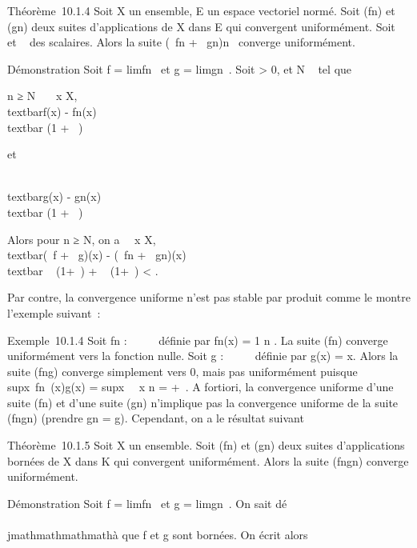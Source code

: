 Théorème~10.1.4 Soit X un ensemble, E un espace vectoriel normé. Soit
(fn) et (gn) deux suites d'applications de X dans E
qui convergent uniformément. Soit \alpha~ et \beta~ des scalaires. Alors la suite
(\alpha~fn + \beta~gn)n\in{}~ converge uniformément.

Démonstration Soit f = limfn~ et g
= limgn~. Soit \epsilon \textgreater{} 0, et
N \in {}~ tel que

n ≥ N \rigtharrow~\forall~~x \in X, \\textbar{}f(x)
- fn(x)\\textbar{} \leq \epsilon {}(1 + \textbar{}\alpha~\textbar{})

et

\\textbar{}g(x) -
gn(x)\\textbar{} \leq \epsilon {}(1
+ \textbar{}\beta~\textbar{})

Alors pour n ≥ N, on a \forall~~x \in X,
\\textbar{}(\alpha~f + \beta~g)(x) - (\alpha~fn +
\beta~gn)(x)\\textbar{} \leq\textbar{}\alpha~\textbar{} \epsilon
{}(1+\textbar{}\alpha~\textbar{}) +
\textbar{}\beta~\textbar{} \epsilon {}(1+\textbar{}\beta~\textbar{}) \textless{} \epsilon.

Par contre, la convergence uniforme n'est pas stable par produit comme
le montre l'exemple suivant~:

Exemple~10.1.4 Soit fn : ~ \rightarrow~ ~ définie par fn(x) =
1 \over n . La suite (fn) converge
uniformément vers la fonction nulle. Soit g : ~ \rightarrow~ ~ définie par g(x) =
x. Alors la suite (fng) converge simplement vers 0, mais pas
uniformément puisque
supx\in{}~\textbar{}fn~(x)g(x)\textbar{}
= supx\in{}~~\left
\textbar{} x \over n \right \textbar{}
= +\infty~. A fortiori, la convergence uniforme d'une suite (fn) et
d'une suite (gn) n'implique pas la convergence uniforme de la
suite (fngn) (prendre gn = g). Cependant,
on a le résultat suivant

Théorème~10.1.5 Soit X un ensemble. Soit (fn) et
(gn) deux suites d'applications bornées de X dans K qui
convergent uniformément. Alors la suite (fngn)
converge uniformément.

Démonstration Soit f = limfn~ et g
= limgn~. On sait dé\\\\jmathmathmathmathà que f et g
sont bornées. On écrit alors

